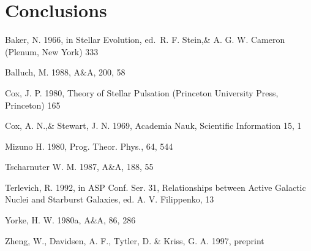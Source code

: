 \documentclass{aa}
\begin{document}

\section{Conclusions}

  
\begin{acknowledgements}

\end{acknowledgements}



\begin{thebibliography}{}

   Baker, N. 1966,
      in Stellar Evolution,
      ed.\ R. F. Stein,\& A. G. W. Cameron
      (Plenum, New York) 333

    Balluch, M. 1988,
      A\&A, 200, 58

    Cox, J. P. 1980,
      Theory of Stellar Pulsation
      (Princeton University Press, Princeton) 165

    Cox, A. N.,\& Stewart, J. N. 1969,
      Academia Nauk, Scientific Information 15, 1

    Mizuno H. 1980,
      Prog. Theor. Phys., 64, 544
   
    Tscharnuter W. M. 1987,
      A\&A, 188, 55
  
    Terlevich, R. 1992, in ASP Conf. Ser. 31, 
      Relationships between Active Galactic Nuclei and Starburst Galaxies, 
      ed. A. V. Filippenko, 13

    Yorke, H. W. 1980a,
      A\&A, 86, 286

    Zheng, W., Davidsen, A. F., Tytler, D. \& Kriss, G. A.
      1997, preprint
\end{thebibliography}
\end{document}
